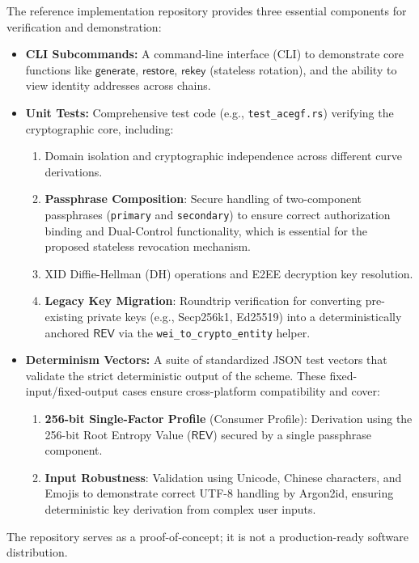 \documentclass[12pt,a4paper]{article}
\begin{document}
The reference implementation repository provides three essential components for verification and demonstration:
\begin{itemize}
  \item \textbf{CLI Subcommands:} A command-line interface (CLI) to demonstrate core functions like $\mathsf{generate}$, $\mathsf{restore}$, $\mathsf{rekey}$ (stateless rotation), and the ability to view identity addresses across chains.
  \item \textbf{Unit Tests:} Comprehensive test code (e.g., \texttt{test\_acegf.rs}) verifying the cryptographic core, including:
  \begin{enumerate}
    \item Domain isolation and cryptographic independence across different curve derivations.
    \item \textbf{Passphrase Composition}: Secure handling of two-component passphrases (\texttt{primary} and \texttt{secondary}) to ensure correct authorization binding and Dual-Control functionality, which is essential for the proposed stateless revocation mechanism.
    \item XID Diffie-Hellman (DH) operations and E2EE decryption key resolution.
    \item \textbf{Legacy Key Migration}: Roundtrip verification for converting pre-existing private keys (e.g., Secp256k1, Ed25519) into a deterministically anchored $\mathsf{REV}$ via the \texttt{wei\_to\_crypto\_entity} helper.
  \end{enumerate}
  \item \textbf{Determinism Vectors:} A suite of standardized JSON test vectors that validate the strict deterministic output of the scheme. These fixed-input/fixed-output cases ensure cross-platform compatibility and cover:
  \begin{enumerate}
    \item \textbf{256-bit Single-Factor Profile} (Consumer Profile): Derivation using the 256-bit Root Entropy Value ($\mathsf{REV}$) secured by a single passphrase component.
    \item \textbf{Input Robustness}: Validation using Unicode, Chinese characters, and Emojis to demonstrate correct UTF-8 handling by Argon2id, ensuring deterministic key derivation from complex user inputs.
  \end{enumerate}
  \end{itemize}
The repository serves as a proof-of-concept; it is not a production-ready software distribution.
\end{document}
